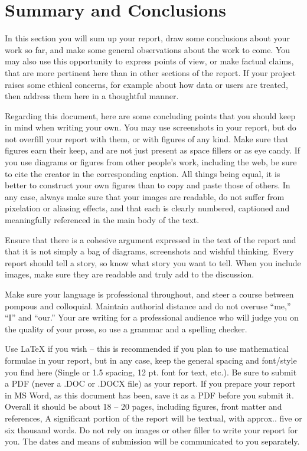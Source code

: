 \documentclass[]{UCD_CS_FYP_Report}
\begin{document}
\chapter{Summary and Conclusions}
In this section you will sum up your report, draw some conclusions about your work so far, and make some general observations about the work to come. You may also use this opportunity to express points of view, or make factual claims, that are more pertinent here than in other sections of the report. If your project raises some ethical concerns, for example about how data or users are treated, then address them here in a thoughtful manner.

Regarding this document, here are some concluding points that you should keep in mind when writing your own. You may use screenshots in your report, but do not overfill your report with them, or with figures of any kind. Make sure that figures earn their keep, and are not just present as space fillers or as eye candy. If you use diagrams or figures from other people’s work, including the web, be sure to cite the creator in the corresponding caption. All things being equal, it is better to construct your own figures than to copy and paste those of others. In any case, always make sure that your images are readable, do not suffer from pixelation or aliasing effects, and that each is clearly numbered, captioned and meaningfully referenced in the main body of the text.

Ensure that there is a cohesive argument expressed in the text of the report and that it is not simply a bag of diagrams, screenshots and wishful thinking. Every report should tell a story, so know what story you want to tell. When you include images, make sure they are readable and truly add to the discussion.
	
Make sure your language is professional throughout, and steer a course between pompous and colloquial. Maintain authorial distance and do not overuse “me,” “I” and “our.” Your are writing for a professional audience who will judge you on the quality of your prose, so use a grammar and a spelling checker. 

Use LaTeX if you wish – this is recommended if you plan to use mathematical formulae in your report, but in any case, keep the general spacing and font/style you find here (Single or 1.5 spacing, 12 pt. font for text, etc.). Be sure to submit a PDF (never a .DOC or .DOCX file) as your report. If you prepare your report in MS Word, as this document has been, save it as a PDF before you submit it. Overall it should be about 18 – 20 pages, including figures, front matter and references, A significant portion of the report will be textual, with approx.. five or six thousand words. Do not rely on images or other filler to write your report for you. 
The dates and means of submission will be communicated to you separately.
\end{document}
